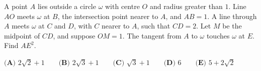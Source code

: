 A point $A$ lies outside a circle $\omega$ with centre $O$ and radius greater than $1$. Line $AO$ meets $\omega$ at $B$, the intersection point nearer to $A$, and $AB=1$. A line through $A$ meets $\omega$ at $C$ and $D$, with $C$ nearer to $A$, such that $CD=2$. Let $M$ be the midpoint of $CD$, and suppose $OM=1$. The tangent from $A$ to $\omega$ touches $\omega$ at $E$. Find $AE^2$.

$\textbf{(A) } 2\sqrt2+1 \qquad \textbf{(B) } 2\sqrt3+1 \qquad \textbf{(C) } \sqrt3+1 \qquad \textbf{(D) } 6 \qquad \textbf{(E) } 5+2\sqrt2$
